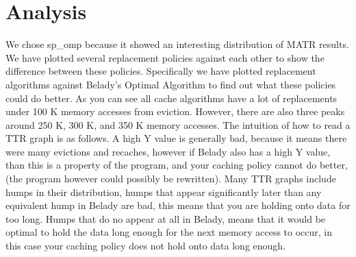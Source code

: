 \section{Analysis}


We chose sp\_omp because it showed an interesting distribution of MATR results.
We have plotted several replacement policies against each other to show the difference between these policies.
Specifically we have plotted replacement algorithms against Belady's Optimal Algorithm to find out what these policies could do better.
As you can see all cache algorithms have a lot of replacements under 100 K memory accesses from eviction.
However, there are also three peaks around 250 K, 300 K, and 350 K memory accesses.
The intuition of how to read a TTR graph is as follows.
A high Y value is generally bad, because it means there were many evictions and recaches,
 however if Belady also has a high Y value, than this is a property of the program, and your caching policy cannot do better,
 (the program however could possibly be rewritten).
Many TTR graphs include humps in their distribution, humps that appear significantly later than any equivalent hump in Belady are bad,
 this means that you are holding onto data for too long.
Humps that do no appear at all in Belady, means that it would be optimal to hold the data long enough for the next memory access to occur,
 in this case your caching policy does not hold onto data long enough.

